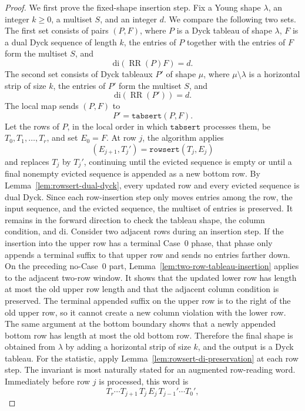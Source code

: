 \documentclass[10pt,a4paper]{amsart}
\newcommand{\di}{\mathrm{di}}
\newcommand{\rowsert}{\texttt{rowsert}}
\begin{document}
\begin{proof}
We first prove the fixed-shape insertion step.  Fix a Young shape \(\lambda\),
an integer \(k\ge 0\), a multiset \(S\), and an integer \(d\).  We compare the
following two sets.
The first set consists of pairs \((P,F)\), where \(P\) is a Dyck tableau of
shape \(\lambda\), \(F\) is a dual Dyck sequence of length \(k\), the entries
of \(P\) together with the entries of \(F\) form the multiset \(S\), and
\[
  \di(\operatorname{RR}(P)F)=d.
\]
The second set consists of Dyck tableaux \(P'\) of shape \(\mu\), where
\(\mu\setminus\lambda\) is a horizontal strip of size \(k\), the entries of
\(P'\) form the multiset \(S\), and
\[
  \di(\operatorname{RR}(P'))=d.
\]
The local map sends \((P,F)\) to
\[
  P'=\texttt{tabsert}(P,F).
\]
Let the rows of \(P\), in the local order in which \(\texttt{tabsert}\)
processes them, be \(T_0,T_1,\ldots,T_r\), and set \(E_0=F\).  At row \(j\),
the algorithm applies
\[
  (E_{j+1},T_j')=\rowsert(T_j,E_j)
\]
and replaces \(T_j\) by \(T_j'\), continuing until the evicted sequence is empty
or until a final nonempty evicted sequence is appended as a new bottom row.  By
Lemma~\ref{lem:rowsert-dual-dyck}, every updated row and every evicted sequence
is dual Dyck.  Since each row-insertion step only moves entries among the row,
the input sequence, and the evicted sequence, the multiset of entries is
preserved.
It remains in the forward direction to check the tableau shape, the column
condition, and \(\di\).  Consider two adjacent rows during an insertion step.
If the insertion into the upper row has a terminal Case~0 phase, that phase
only appends a terminal suffix to that upper row and sends no entries farther
down.  On the preceding no-Case~0 part, Lemma~\ref{lem:two-row-tableau-insertion}
applies to the adjacent two-row window.  It shows that the updated lower row has
length at most the old upper row length and that the adjacent column condition
is preserved.  The terminal appended suffix on the upper row is to the right of
the old upper row, so it cannot create a new column violation with the lower
row.  The same argument at the bottom boundary shows that a newly appended
bottom row has length at most the old bottom row.  Therefore the final shape is
obtained from \(\lambda\) by adding a horizontal strip of size \(k\), and the
output is a Dyck tableau.
For the statistic, apply Lemma~\ref{lem:rowsert-di-preservation} at each row
step.  The invariant is most naturally stated for an augmented row-reading word.
Immediately before row \(j\) is processed, this word is
\[
  T_r\cdots T_{j+1}\,T_j\,E_j\,T_{j-1}'\cdots T_0',
\]
\end{proof}
\end{document}
